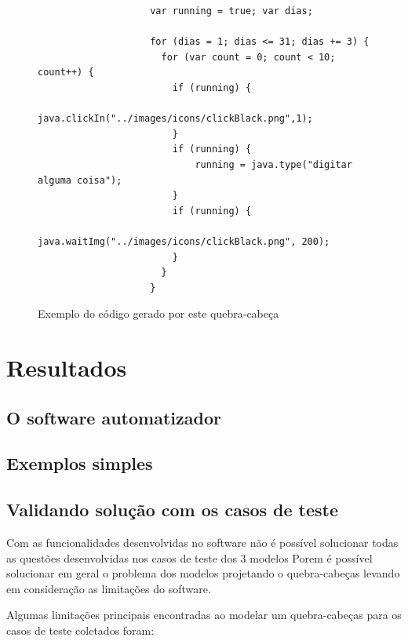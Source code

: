 \documentclass[tg]{mdtufsm}
\begin{document}
                \begin{figure}[!htb]
                \begin{lstlisting}
                    var running = true; var dias;

                    for (dias = 1; dias <= 31; dias += 3) {
                      for (var count = 0; count < 10; count++) {
                        if (running) {
                        java.clickIn("../images/icons/clickBlack.png",1);
                        }
                        if (running) {
                            running = java.type("digitar alguma coisa");
                        }
                        if (running) {
                            java.waitImg("../images/icons/clickBlack.png", 200);
                        }
                      }
                    }
                \end{lstlisting}
                    \caption{Exemplo do código gerado por este quebra-cabeça}
                    \label{code:blocosecodigo.js}
                \end{figure}

        \chapter {Resultados}

            \section {O software automatizador}

            \section {Exemplos simples}

            \section {Validando solução com os casos de teste}

            Com as funcionalidades desenvolvidas no software não é possível solucionar todas as questões desenvolvidas nos casos de teste dos 3 modelos Porem é possível solucionar em geral o problema dos modelos projetando o quebra-cabeças levando em consideração as limitações do software.

            Algumas limitações principais encontradas ao modelar um quebra-cabeças para os casos de teste coletados foram:
\end{document}
